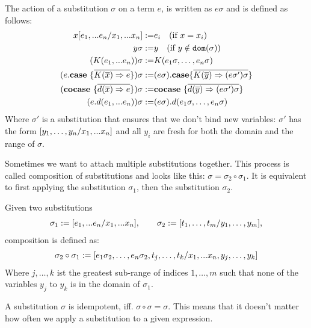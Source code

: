 \documentclass[twoside,12pt,a4paper]{article}
\begin{document}
\begin{definition}
    The action of a substitution $\sigma$ on a term $e$, is written as $e \sigma$ and is defined as follows:
    \begin{align*}
        x[e_1,...e_n / x_1,...x_n] :=& e_i \quad(\text{if } x=x_i) \\
        y\sigma :=& y\quad (\text{if }y\notin \texttt{dom}(\sigma))\\
        (K(e_1,...e_n))\sigma :=& K(e_1 \sigma,\dots , e_n \sigma)\\
        (e.\textbf{case}\ \{\overline{K(\overline{x})\Rightarrow e}\})\sigma:=& (e\sigma).\textbf{case}\{\overline{K(\overline{y})\Rightarrow (e\sigma')\sigma}\}\\
        (\textbf{cocase}\ \{\overline{d(\overline{x})\Rightarrow e}\})\sigma:=& \textbf{cocase}\ \{\overline{d(\overline{y})\Rightarrow(e\sigma')\sigma}\}\\
        (e.d(e_1,...e_n)) \sigma:=& (e \sigma).d(e_1 \sigma,\dots , e_n \sigma)
    \end{align*} 
    Where $\sigma'$ is a substitution that ensures that we don't bind new variables: 
    $\sigma'$ has the form $[y_1,\dots, y_n/x_1,...x_n]$ and all $y_i$ are fresh for both the domain and the range of $\sigma$.
\end{definition}


Sometimes we want to attach multiple substitutions together.
This process is called composition of substitutions and looks like this: $\sigma = \sigma_2 \circ \sigma_1$.
It is equivalent to first applying the substitution $\sigma_1$, then the substitution $\sigma_2$.

\begin{definition}
    Given two substitutions
    \begin{align*}
        \sigma_1 := [e_1,...e_n/x_1,...x_n],\qquad \sigma_2 := [t_1,\dots,t_m/y_1,\dots,y_m],
    \end{align*}
    composition is defined as:
    \begin{align*}
        \sigma_2\circ\sigma_1 := [e_1\sigma_2,\dots,e_n\sigma_2,t_j,\dots,t_k/x_1,...x_n,y_j,\dots,y_k]
    \end{align*}
    Where $j, \dots, k$ ist the greatest sub-range of indices $1,\dots,m$ such that none of the variables $y_j$ to $y_k$ is in the domain of $\sigma_1$. 
\end{definition}

\begin{definition}[Idempotency]
    A substitution $\sigma$ is idempotent, iff. $\sigma \circ \sigma = \sigma$.
    This means that it doesn't matter how often we apply a substitution to a given expression.
\end{definition}
\end{document}
